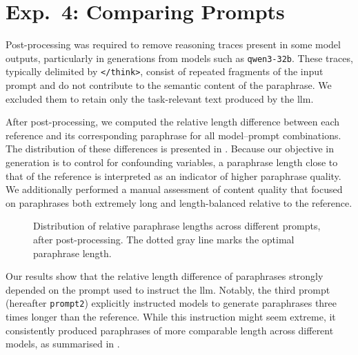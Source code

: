 \section{Exp.\ 4: Comparing Prompts}%
\label{subsec:prompt_impact_res}


Post-processing was required to remove reasoning traces present in some model outputs, particularly in generations from models such as \texttt{qwen3-32b}. 
These traces, typically delimited by \texttt{</think>}, consist of repeated fragments of the input prompt and do not contribute to the semantic content of the paraphrase. 
We excluded them to retain only the task-relevant text produced by the \ac{llm}.

After post-processing, we computed the relative length difference between each reference and its corresponding paraphrase for all model–prompt combinations. 
The distribution of these differences is presented in . 
Because our objective in \imp{} generation is to control for confounding variables, a paraphrase length close to that of the reference is interpreted as an indicator of higher paraphrase quality. 
We additionally performed a manual assessment of content quality that focused on paraphrases both extremely long and length-balanced relative to the reference.

\begin{figure}[htbp]
    \centering
    
    \caption[Impact of different prompts on paraphrases.]{
    Distribution of relative paraphrase lengths across different prompts, after post-processing.    
    The dotted gray line marks the optimal paraphrase length.
    }
    \label{fig:prompt_impact_post_processed}
\end{figure}

Our results show that the relative length difference of paraphrases strongly depended on the prompt used to instruct the \ac{llm}. 
Notably, the third prompt (hereafter \texttt{prompt2}) explicitly instructed models to generate paraphrases three times longer than the reference. 
While this instruction might seem extreme, it consistently produced paraphrases of more comparable length across different models, as summarised in .

